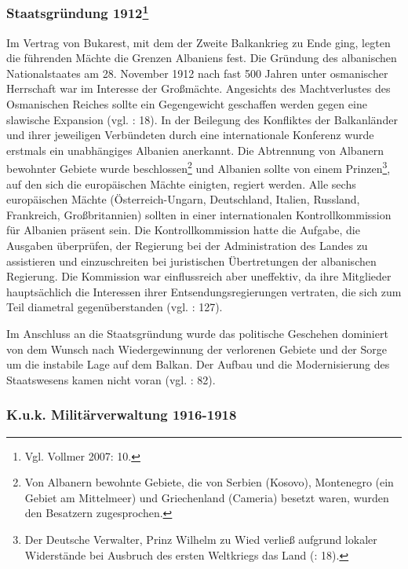 \subsubsection[Staatsgründung 1912 ]{Staatsgründung 1912\footnote{Vgl. Vollmer 2007: 10.}}

Im Vertrag von Bukarest, mit dem der Zweite Balkankrieg zu Ende ging, legten die führenden Mächte die Grenzen Albaniens fest. Die Gründung des albanischen Nationalstaates am 28. November 1912 nach fast 500 Jahren unter osmanischer Herrschaft war im Interesse der Großmächte. Angesichts des Machtverlustes des Osmanischen Reiches sollte ein Gegengewicht geschaffen werden gegen eine slawische Expansion (vgl. \cite{biber}: 18). In der Beilegung des Konfliktes der Balkanländer und ihrer jeweiligen Verbündeten durch eine internationale Konferenz wurde erstmals ein unabhängiges Albanien anerkannt. Die Abtrennung von Albanern bewohnter Gebiete wurde beschlossen\footnote{Von Albanern bewohnte Gebiete, die von Serbien (Kosovo), Montenegro (ein Gebiet am Mittelmeer) und Griechenland (Cameria) besetzt waren, wurden den Besatzern zugesprochen.} und Albanien sollte von einem Prinzen\footnote{Der Deutsche Verwalter, Prinz Wilhelm zu Wied verließ aufgrund lokaler Widerstände bei Ausbruch des ersten Weltkriegs das Land (\cite{biber}: 18). }, auf den sich die europäischen Mächte einigten, regiert werden. Alle sechs europäischen Mächte (Österreich-Ungarn, Deutschland, Italien, Russland, Frankreich, Großbritannien) sollten in einer internationalen Kontrollkommission für Albanien präsent sein. Die Kontrollkommission hatte die Aufgabe, die Ausgaben überprüfen, der Regierung bei der Administration des Landes zu assistieren und einzuschreiten bei juristischen Übertretungen der albanischen Regierung. Die Kommission war einflussreich aber uneffektiv, da ihre Mitglieder hauptsächlich die Interessen ihrer Entsendungsregierungen vertraten, die sich zum Teil diametral gegenüberstanden (vgl. \cite{chek}: 127).\par
Im Anschluss an die Staatsgründung wurde das politische Geschehen dominiert von dem Wunsch nach Wiedergewinnung der verlorenen Gebiete und der Sorge um die instabile Lage auf dem Balkan. Der Aufbau und die Modernisierung des Staatswesens kamen nicht voran (vgl. \cite{hens99}: 82).
\subsubsection{K.u.k. Militärverwaltung 1916-1918}

